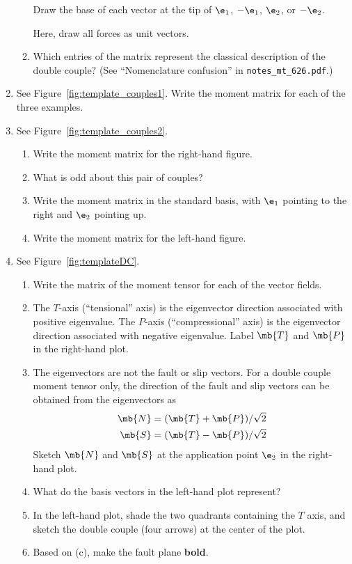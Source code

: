 \documentclass[11pt,titlepage,fleqn]{article}
\newcommand{\mtfile}{\texttt{notes\_mt\_626.pdf}}
\begin{document}
\begin{enumerate}
\begin{enumerate}
Draw the base of each vector at the tip of $\e_1$, $-\e_1$, $\e_2$, or $-\e_2$.

Here, draw all forces as unit vectors. 

\item Which entries of the matrix represent the classical description of the double couple?
(See ``Nomenclature confusion'' in \mtfile.)
\end{enumerate}


\item 
\label{prob:couples1}
See Figure~\ref{fig:template_couples1}.
Write the moment matrix for each of the three examples.


\item
\label{prob:couples2}
See Figure~\ref{fig:template_couples2}.
%
\begin{enumerate}
\item Write the moment matrix for the right-hand figure.
\item What is odd about this pair of couples?
\item Write the moment matrix in the standard basis, with $\e_1$ pointing to the right and $\e_2$ pointing up.
\item Write the moment matrix for the left-hand figure.
\end{enumerate}


\item 
\label{prob:DC}
See Figure~\ref{fig:templateDC}.
%
\begin{enumerate}
\item Write the matrix of the moment tensor for each of the vector fields.

\item The $T$-axis (``tensional'' axis) is the eigenvector direction associated with positive eigenvalue. The $P$-axis (``compressional'' axis) is the eigenvector direction associated with negative eigenvalue. Label $\mb{T}$ and $\mb{P}$ in the right-hand plot.

\item The eigenvectors are not the fault or slip vectors. For a double couple moment tensor only, the direction of the fault and slip vectors can be obtained from the eigenvectors as 
%
\begin{eqnarray*}
\mb{N} = (\mb{T} + \mb{P})/\sqrt{2}
\\
\mb{S} = (\mb{T} - \mb{P})/\sqrt{2}
\end{eqnarray*}
%
Sketch $\mb{N}$ and $\mb{S}$ at the application point $\e_2$ in the right-hand plot.
\item What do the basis vectors in the left-hand plot represent?
\item In the left-hand plot, shade the two quadrants containing the $T$ axis, and sketch the double couple (four arrows) at the center of the plot.
\item Based on (c), make the fault plane {\bf bold}.
\end{enumerate}


\end{enumerate}
\end{document}
